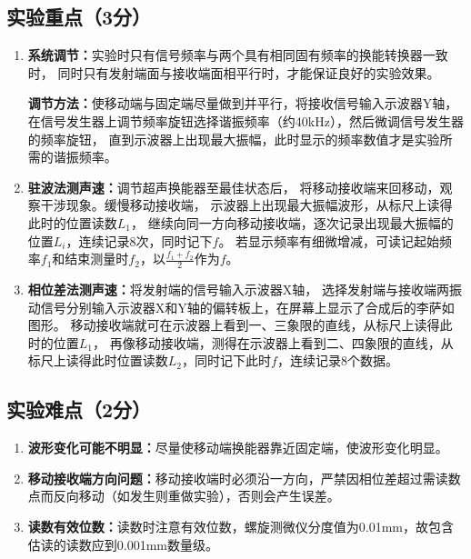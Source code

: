 \documentclass{Preport}
\begin{document}
\subsection{实验重点（3分）}
\begin{enumerate}
    \item \textbf{系统调节：}实验时只有信号频率与两个具有相同固有频率的换能转换器一致时，
    同时只有发射端面与接收端面相平行时，才能保证良好的实验效果。

    \textbf{调节方法：}使移动端与固定端尽量做到并平行，将接收信号输入示波器Y轴，
    在信号发生器上调节频率旋钮选择谐振频率（约40\si{\kilo\hertz}），然后微调信号发生器的频率旋钮，
    直到示波器上出现最大振幅，此时显示的频率数值才是实验所需的谐振频率。

    \item \textbf{驻波法测声速：}调节超声换能器至最佳状态后，
    将移动接收端来回移动，观察干涉现象。缓慢移动接收端，
    示波器上出现最大振幅波形，从标尺上读得此时的位置读数$L_1$，
    继续向同一方向移动接收端，逐次记录出现最大振幅的位置$L_i$，连续记录8次，同时记下$f$。
    若显示频率有细微增减，可读记起始频率$f_1$和结束测量时$f_2$，以$\frac{f_1+f_2}{2}$作为$f$。

    \item \textbf{相位差法测声速：}将发射端的信号输入示波器X轴，
    选择发射端与接收端两振动信号分别输入示波器X和Y轴的偏转板上，在屏幕上显示了合成后的李萨如图形。
    移动接收端就可在示波器上看到一、三象限的直线，从标尺上读得此时的位置$L_1$，
    再像移动接收端，测得在示波器上看到二、四象限的直线，从标尺上读得此时位置读数$L_2$，同时记下此时$f$，连续记录8个数据。
\end{enumerate}
\subsection{实验难点（2分）}
\begin{enumerate}
    \item \textbf{波形变化可能不明显：}尽量使移动端换能器靠近固定端，使波形变化明显。
    \item \textbf{移动接收端方向问题：}移动接收端时必须沿一方向，严禁因相位差超过需读数点而反向移动（如发生则重做实验），否则会产生误差。
    \item \textbf{读数有效位数：}读数时注意有效位数，螺旋测微仪分度值为0.01\si{\milli\metre}，故包含估读的读数应到0.001\si{\milli\metre}数量级。
\end{enumerate}

\end{document}
